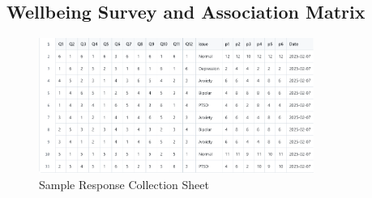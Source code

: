\subsection{Wellbeing Survey and Association Matrix}

\begin{figure}[H]  
    \centering
    \includegraphics[width=0.8\textwidth]{App Images/32 Interface.png}  
    \caption*{Sample Response Collection Sheet}
    \label{01i}  %
\end{figure}

\pagebreak

